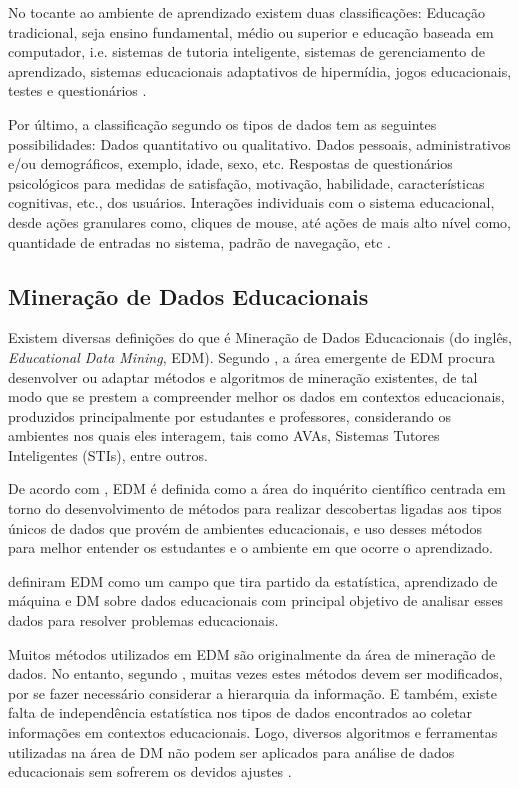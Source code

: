 No tocante ao ambiente de aprendizado existem duas classificações: Educação
tradicional, seja ensino fundamental, médio ou superior e educação baseada em
computador, i.e. sistemas de tutoria inteligente, sistemas de gerenciamento de
aprendizado, sistemas educacionais adaptativos de hipermídia, jogos
educacionais, testes e questionários \cite{romero2013data}.

Por último, a classificação segundo os tipos de dados tem as seguintes
possibilidades: Dados quantitativo ou qualitativo. Dados pessoais,
administrativos e/ou demográficos, exemplo, idade, sexo, etc. Respostas de
questionários psicológicos para medidas de satisfação, motivação, habilidade,
características cognitivas, etc., dos usuários. Interações individuais com o
sistema educacional, desde ações granulares como, cliques de mouse, até ações de
mais alto nível como, quantidade de entradas no sistema, padrão de navegação,
etc \cite{bousbia2014contribution}.

\subsection{Mineração de Dados Educacionais}

Existem diversas definições do que é Mineração de Dados Educacionais (do inglês,
\textit{Educational Data Mining}, EDM). Segundo
, a área emergente de EDM procura desenvolver ou
adaptar métodos e algoritmos de mineração existentes, de tal modo que se prestem
a compreender melhor os dados em contextos educacionais, produzidos
principalmente por estudantes e professores, considerando os ambientes nos quais
eles interagem, tais como AVAs, Sistemas Tutores Inteligentes (STIs), entre
outros.

De acordo com , EDM é definida como a área do
inquérito científico centrada em torno do desenvolvimento de métodos para
realizar descobertas ligadas aos tipos únicos de dados que provém de ambientes
educacionais, e uso desses métodos para melhor entender os estudantes e o
ambiente em que ocorre o aprendizado.

 definiram EDM como um campo que tira partido
da estatística, aprendizado de máquina e DM sobre dados educacionais com
principal objetivo de analisar esses dados  para resolver problemas
educacionais.

Muitos métodos utilizados em EDM são originalmente da área de mineração de
dados. No entanto, segundo , muitas vezes estes
métodos devem ser modificados, por se fazer necessário considerar a hierarquia
da informação. E também, existe falta de independência estatística nos tipos de
dados encontrados ao coletar informações em contextos educacionais. Logo,
diversos algoritmos e ferramentas utilizadas na área de DM não podem ser
aplicados para análise de dados educacionais sem sofrerem os devidos ajustes
\cite{baker2011mineraccao,costa2012mineraccao}.

